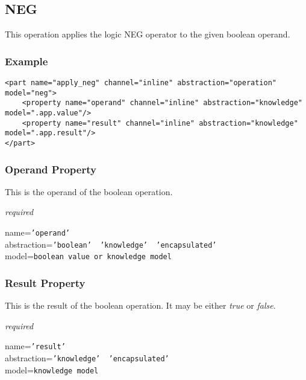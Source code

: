 %
%
%
%
%
%

\subsection{NEG}
\label{neg_heading}

This operation applies the logic NEG operator to the given boolean operand.

\subsubsection{Example}

\begin{scriptsize}
    \begin{verbatim}
<part name="apply_neg" channel="inline" abstraction="operation" model="neg">
    <property name="operand" channel="inline" abstraction="knowledge" model=".app.value"/>
    <property name="result" channel="inline" abstraction="knowledge" model=".app.result"/>
</part>
    \end{verbatim}
\end{scriptsize}

\subsubsection{Operand Property}

This is the operand of the boolean operation.

\emph{required}

name=\texttt{'operand'}\\
abstraction=\texttt{'boolean' \vline\ 'knowledge' \vline\ 'encapsulated'}\\
model=\texttt{boolean value or knowledge model}

\subsubsection{Result Property}

This is the result of the boolean operation. It may be either \emph{true} or
\emph{false}.

\emph{required}

name=\texttt{'result'}\\
abstraction=\texttt{'knowledge' \vline\ 'encapsulated'}\\
model=\texttt{knowledge model}
